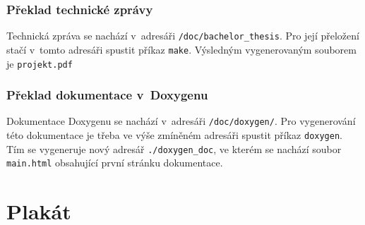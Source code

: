 \subsection{Překlad technické zprávy}
Technická zpráva se nachází v~adresáři \texttt{/doc/bachelor\_thesis}.
Pro její přeložení stačí v~tomto adresáři spustit příkaz \texttt{make}.
Výsledným vygenerovaným souborem je \texttt{projekt.pdf}

\subsection{Překlad dokumentace v~Doxygenu}
Dokumentace Doxygenu se nachází v~adresáři \texttt{/doc/doxygen/}.
Pro vygenerování této dokumentace je třeba ve výše zmíněném adresáři spustit příkaz \texttt{doxygen}.
Tím se vygeneruje nový adresář \texttt{./doxygen\_doc}, ve kterém se nachází soubor \texttt{main.html} obsahující první stránku dokumentace.

\chapter{Plakát}

